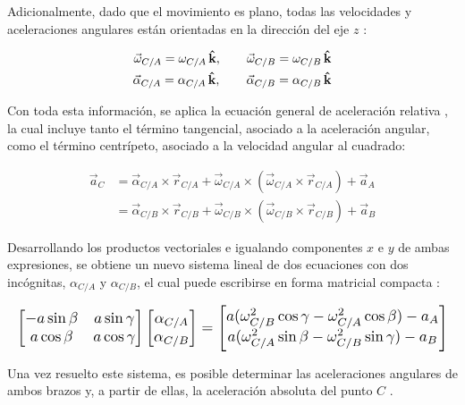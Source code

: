 Adicionalmente, dado que el movimiento es plano, todas las velocidades y
aceleraciones angulares están orientadas en la dirección del eje $z$
\cite{meriam2018}:

\begin{align*}
    \vec{\omega}_{C/A} = \omega_{C/A}\,\mathbf{\hat{k}}, \qquad
    \vec{\omega}_{C/B} = \omega_{C/B}\,\mathbf{\hat{k}} \\
    \vec{\alpha}_{C/A} = \alpha_{C/A}\,\mathbf{\hat{k}}, \qquad
    \vec{\alpha}_{C/B} = \alpha_{C/B}\,\mathbf{\hat{k}}
\end{align*}

Con toda esta información, se aplica la ecuación general de aceleración
relativa \cite{beer2019}, la cual incluye tanto el término tangencial,
asociado a la aceleración angular, como el término centrípeto, asociado a la
velocidad angular al cuadrado:

\begin{align*}
  \vec{a}_C &= \vec{\alpha}_{C/A} \times \vec{r}_{C/A} + \vec{\omega}_{C/A} \times
    \left(\vec{\omega}_{C/A} \times \vec{r}_{C/A}\right) + \vec{a}_A \\
     &= \vec{\alpha}_{C/B} \times \vec{r}_{C/B} + \vec{\omega}_{C/B} \times
    \left(\vec{\omega}_{C/B} \times \vec{r}_{C/B}\right) + \vec{a}_B
\end{align*}

Desarrollando los productos vectoriales e igualando componentes $x$ e $y$ de
ambas expresiones, se obtiene un nuevo sistema lineal de dos ecuaciones con
dos incógnitas, $\alpha_{C/A}$ y $\alpha_{C/B}$, el cual puede escribirse en
forma matricial compacta \cite{hibbeler2016}:

\begin{equation*}
    \resizebox{\columnwidth}{!}{$
    \begin{bmatrix}
        -a\sin\beta & a\sin\gamma \\
        a\cos\beta  & a\cos\gamma
    \end{bmatrix}
    \begin{bmatrix} \alpha_{C/A} \\ \alpha_{C/B} \end{bmatrix}
    =
    \begin{bmatrix}
        a(\omega_{C/B}^{2}\cos\gamma - \omega_{C/A}^{2}\cos\beta) - a_A \\
        a(\omega_{C/A}^{2}\sin\beta - \omega_{C/B}^{2}\sin\gamma) - a_B
    \end{bmatrix}
    $}
\end{equation*}

Una vez resuelto este sistema, es posible determinar las aceleraciones
angulares de ambos brazos y, a partir de ellas, la aceleración absoluta del
punto $C$ \cite{meriam2018}.

